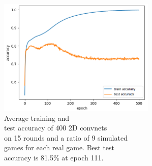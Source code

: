 \begin{minipage}{0.5\textwidth}
	\begin{figure}[H]
		\centering
		\includegraphics[width=7.5cm]{images/bestHistories/edit/2d_30s_sd9x_acc.png}
		\caption[Average training and test accuracy of 400 2D convnets on 15 rounds and a ratio of 9 simulated games for each real game.]{Average training and \\\hspace{0\textwidth}test accuracy of 400 2D convnets \\\hspace{0\textwidth}on 15 rounds and a ratio of 9 simulated  \\\hspace{0\textwidth}games for each real game. Best test \\\hspace{0\textwidth}accuracy is 81.5\% at epoch 111.}
		\label{fig:2d30}
	\end{figure}
\end{minipage}
